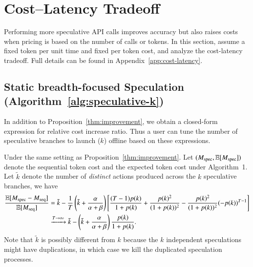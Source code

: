 \section{Cost--Latency Tradeoff}
\label{sec:cost-latency}
Performing more speculative API calls improves accuracy but also raises costs when pricing is based on the number of calls or tokens. In this section, assume a fixed token per unit time and fixed per token cost, and analyze the cost-latency tradeoff. Full details can be found in Appendix~\ref{app:cost-latency}.

\subsection{Static breadth-focused Speculation 
(Algorithm~\ref{alg:speculative-k})}
\label{subsec:breadth}
In addition to Proposition~\ref{thm:improvement}, we obtain a closed-form expression for relative cost increase ratio. Thus a user can tune the number of speculative branches to launch ($k$) offline based on these expressions.
\begin{theorem}
\label{thm:cost-latency-tradeoff}
Under the same setting as Proposition~\ref{thm:improvement}. Let
$
(M_{\mathrm{spec}}, \mathbb{E}[M_{\mathrm{spec}}])
$
denote the sequential token cost and the expected token cost under Algorithm~1. Let $\tilde{k}$ denote the number of \emph{distinct} actions produced across the $k$ speculative branches, we have
\begin{align*}
    \frac{\mathbb{E}[M_{\mathrm{spec}} - M_{\mathrm{seq}}]}{\mathbb{E}[M_{\mathrm{seq}}]}
    &=\tilde{k}
    -\frac{1}{T}\left(\tilde{k}+\frac{\alpha}{\alpha+\beta}\right)
    \left[
        \frac{(T-1)p(k)}{1+p(k)}
        +\frac{p(k)^2}{(1+p(k))^2}
        -\frac{p(k)^2}{(1+p(k))^2}(-p(k))^{T-1}
    \right]
    \\
    &\xrightarrow{T\to\infty}
    \tilde{k}
    -
    \left(\tilde{k}+\frac{\alpha}{\alpha+\beta}\right)
    \frac{p(k)}{1+p(k)}.
\end{align*}
Note that $\tilde{k}$ is possibly different from $k$ because the $k$ independent speculations might have duplications, in which case we kill the duplicated speculation processes.
\end{theorem}
